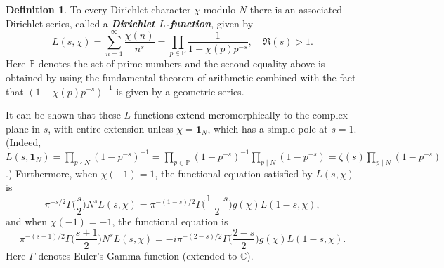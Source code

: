 \documentclass[10pt,leqno,twoside]{article}
\theoremstyle{plain}
\theoremstyle{definition}
\newtheorem{definition/}[lem]{Definition}
\newenvironment{definition}
  {\renewcommand{\qedsymbol}{\textdagger}%
   \pushQED{\qed}\begin{definition/}}
  {\popQED\end{definition/}}
\numberwithin{equation}{section}
\numberwithin{lem}{section}
\newcommand{\textib}[1]{\textbf{\textit{#1\index{#1}}}} %
\begin{document}
\begin{definition}
    To every Dirichlet character $\chi$ modulo $N$ there is an associated Dirichlet series, called a \textib{Dirichlet $L$-function}, given by 
    \[L(s,\chi) = \sum_{n=1}^\infty \frac{\chi(n)}{n^s} = \prod_{p\in\mathbb P}\frac{1}{1-\chi(p)p^{-s}},\quad \Re(s)>1.\] Here $\mathbb P$ denotes the set of prime numbers and the second equality above is obtained by using the fundamental theorem of arithmetic combined with the fact that $(1-\chi(p)p^{-s})^{-1}$ is given by a geometric series.
\end{definition}
It can be shown that these $L$-functions extend meromorphically to the complex plane in $s$, with entire extension unless $\chi = \mathbf 1_N$, which has a simple pole at $s = 1$. (Indeed, $L(s,\mathbf 1_N) = \prod_{p\nmid N}(1-p^{-s})^{-1} = \prod_{p\in\mathbb P}(1-p^{-s})^{-1}\prod_{p\mid N}(1-p^{-s}) = \zeta(s)\prod_{p\mid N}(1-p^{-s})$.) Furthermore, when $\chi(-1) = 1$, the functional equation satisfied by $L(s,\chi)$ is 
\[\pi^{-s/2}\varGamma\Big(\frac{s}{2}\Big)N^sL(s,\chi) = \pi^{-(1-s)/2}\varGamma\Big(\frac{1-s}{2}\Big)g(\chi)L(1-s,\chi),\] and when $\chi(-1)=-1$, the functional equation is 
\[\pi^{-(s+1)/2}\varGamma\Big(\frac{s+1}{2}\Big)N^sL(s,\chi) = -i\pi^{-(2-s)/2}\varGamma\Big(\frac{2-s}{2}\Big)g(\chi)L(1-s,\chi).\] Here $\varGamma$ denotes Euler's Gamma function (extended to $\mathbb C$). 
\end{document}
